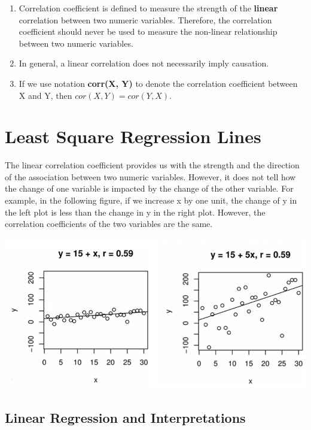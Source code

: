 \documentclass[
]{book}
\begin{document}
\begin{enumerate}
\def\labelenumi{\arabic{enumi}.}
\item
  Correlation coefficient is defined to measure the strength of the \textbf{linear} correlation between two numeric variables. Therefore, the correlation coefficient should never be used to measure the non-linear relationship between two numeric variables.
\item
  In general, a linear correlation does not necessarily imply causation.
\item
  If we use notation \textbf{corr(X, Y)} to denote the correlation coefficient between X and Y, then \(cor(X, Y) = cor(Y, X)\).
\end{enumerate}

\hypertarget{least-square-regression-lines}{%
\section{Least Square Regression Lines}\label{least-square-regression-lines}}

The linear correlation coefficient provides us with the strength and the direction of the association between two numeric variables. However, it does not tell how the change of one variable is impacted by the change of the other variable. For example, in the following figure, if we increase x by one unit, the change of y in the left plot is less than the change in y in the right plot. However, the correlation coefficients of the two variables are the same.

\hfill\break

\begin{center}\includegraphics[width=0.6\linewidth]{week12/corrVSReg} \end{center}

\hfill\break

\hypertarget{linear-regression-and-interpretations}{%
\subsection{Linear Regression and Interpretations}\label{linear-regression-and-interpretations}}
\end{document}
